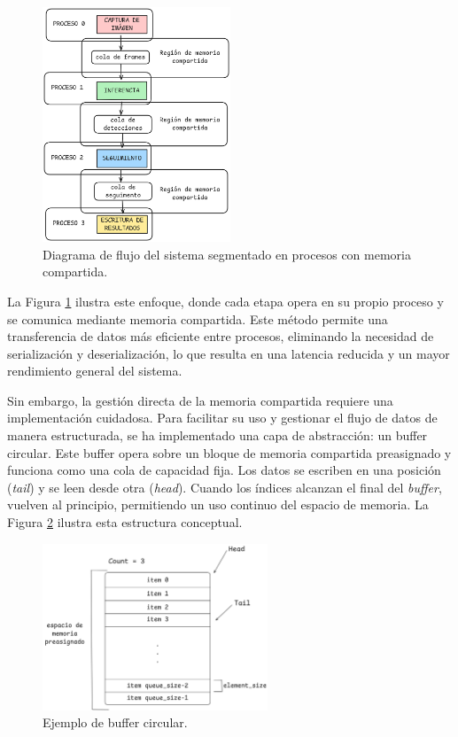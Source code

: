 \documentclass[11pt,spanish,listoffigures,listoftables]{tfgetsinf}
\begin{document}
\begin{figure}[H]
   \centering
   \includegraphics[width=0.5\textwidth]{images/diseno_e_implementacion/segmentacion_procesos_memoria_compartida.png}
   \caption{Diagrama de flujo del sistema segmentado en procesos con memoria compartida.}
   \label{fig:segmentacion_procesos_memoria_compartida}
\end{figure}

La Figura \ref{fig:segmentacion_procesos_memoria_compartida} ilustra este enfoque, donde cada etapa opera en su propio proceso y se comunica mediante memoria compartida. Este método permite una transferencia de datos más eficiente entre procesos, eliminando la necesidad de serialización y deserialización, lo que resulta en una latencia reducida y un mayor rendimiento general del sistema.


Sin embargo, la gestión directa de la memoria compartida requiere una implementación cuidadosa. Para facilitar su uso y gestionar el flujo de datos de manera estructurada, se ha implementado una capa de abstracción: un buffer circular. Este buffer opera sobre un bloque de memoria compartida preasignado y funciona como una cola de capacidad fija. Los datos se escriben en una posición (\textit{tail}) y se leen desde otra (\textit{head}). Cuando los índices alcanzan el final del \textit{buffer}, vuelven al principio, permitiendo un uso continuo del espacio de memoria. La Figura \ref{fig:buffer_circular} ilustra esta estructura conceptual.

\begin{figure}[H]
   \centering
   \includegraphics[width=0.6\textwidth]{images/diseno_e_implementacion/buffer_circular.png}
   \caption{Ejemplo de buffer circular.}
   \label{fig:buffer_circular}
\end{figure}
\end{document}
